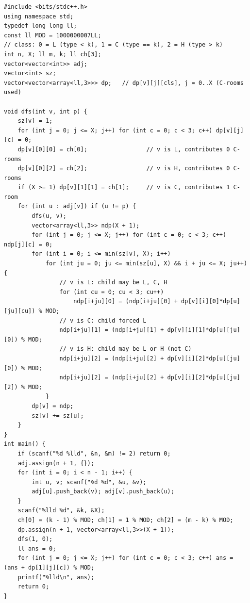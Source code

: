 \begin{lstlisting}[caption={Codeforces 855C -- three-class, C-count budget, one capped child-merge (\coderef{c27-knap} instantiated with a class dimension)}, label={lst:c27-855c-soln}]
#include <bits/stdc++.h>
using namespace std;
typedef long long ll;
const ll MOD = 1000000007LL;
// class: 0 = L (type < k), 1 = C (type == k), 2 = H (type > k)
int n, X; ll m, k; ll ch[3];
vector<vector<int>> adj;
vector<int> sz;
vector<vector<array<ll,3>>> dp;   // dp[v][j][cls], j = 0..X (C-rooms used)

void dfs(int v, int p) {
    sz[v] = 1;
    for (int j = 0; j <= X; j++) for (int c = 0; c < 3; c++) dp[v][j][c] = 0;
    dp[v][0][0] = ch[0];                 // v is L, contributes 0 C-rooms
    dp[v][0][2] = ch[2];                 // v is H, contributes 0 C-rooms
    if (X >= 1) dp[v][1][1] = ch[1];     // v is C, contributes 1 C-room
    for (int u : adj[v]) if (u != p) {
        dfs(u, v);
        vector<array<ll,3>> ndp(X + 1);
        for (int j = 0; j <= X; j++) for (int c = 0; c < 3; c++) ndp[j][c] = 0;
        for (int i = 0; i <= min(sz[v], X); i++)
            for (int ju = 0; ju <= min(sz[u], X) && i + ju <= X; ju++) {
                // v is L: child may be L, C, H
                for (int cu = 0; cu < 3; cu++)
                    ndp[i+ju][0] = (ndp[i+ju][0] + dp[v][i][0]*dp[u][ju][cu]) % MOD;
                // v is C: child forced L
                ndp[i+ju][1] = (ndp[i+ju][1] + dp[v][i][1]*dp[u][ju][0]) % MOD;
                // v is H: child may be L or H (not C)
                ndp[i+ju][2] = (ndp[i+ju][2] + dp[v][i][2]*dp[u][ju][0]) % MOD;
                ndp[i+ju][2] = (ndp[i+ju][2] + dp[v][i][2]*dp[u][ju][2]) % MOD;
            }
        dp[v] = ndp;
        sz[v] += sz[u];
    }
}
int main() {
    if (scanf("%d %lld", &n, &m) != 2) return 0;
    adj.assign(n + 1, {});
    for (int i = 0; i < n - 1; i++) {
        int u, v; scanf("%d %d", &u, &v);
        adj[u].push_back(v); adj[v].push_back(u);
    }
    scanf("%lld %d", &k, &X);
    ch[0] = (k - 1) % MOD; ch[1] = 1 % MOD; ch[2] = (m - k) % MOD;
    dp.assign(n + 1, vector<array<ll,3>>(X + 1));
    dfs(1, 0);
    ll ans = 0;
    for (int j = 0; j <= X; j++) for (int c = 0; c < 3; c++) ans = (ans + dp[1][j][c]) % MOD;
    printf("%lld\n", ans);
    return 0;
}
\end{lstlisting}


